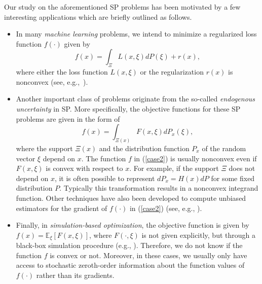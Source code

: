 \documentclass[final]{siamltex}
\newcommand{\beq}{\begin{equation}}
\newcommand{\eeq}{\end{equation}}
\def\eqnok#1{(\ref{#1})}
\newcommand{\bbe}{\mathbb{E}}
\begin{document}
Our study on the aforementioned SP problems
has been motivated by a few interesting applications which are briefly
outlined as follows.
\begin{itemize}
\item In many {\sl machine learning} problems,
we intend to minimize a regularized loss function $f(\cdot)$ given by
\beq \label{case1}
 f(x) = \int_{\Xi} L(x,\xi) dP(\xi) + r(x),
\eeq
where either the loss function $L(x,\xi)$ or the regularization
$r(x)$ is nonconvex (see, e.g.,~\cite{Mairal09,MasBaxBarFre99}).
\item Another important class of problems originate from the
so-called {\sl endogenous uncertainty} in SP.
More specifically, the objective functions for these SP problems are given
in the form of
\beq \label{case2}
f(x) = \int_{\Xi(x)} F(x,\xi) dP_x(\xi),
\eeq
where the support $\Xi(x)$ and the distribution function $P_x$ of
the random vector $\xi$ depend on $x$. The function $f$
in \eqnok{case2} is usually nonconvex
even if $F(x, \xi)$ is convex with respect to $x$.
For example, if the support $\Xi$ does not depend on $x$,
it is often possible to represent $dP_x=H(x)dP$ for some fixed distribution $P$.
Typically this transformation results in a nonconvex integrand function.
Other techniques have also been developed to compute unbiased estimators for the gradient of $f(\cdot)$
in \eqnok{case2} (see, e.g., \cite{Fu06a,Glasserman91,LE90-1,RubSha93}).
\item
Finally, in {\sl simulation-based optimization},
the objective function is given by $f(x) = \bbe_\xi[F(x,\xi)]$, where
$F(\cdot, \xi)$ is not given explicitly, but through a black-box simulation
procedure (e.g., \cite{Andr98-1,Fu02-1}). Therefore,
we do not know if the function $f$ is convex or not.
Moreover, in these cases, we usually only have access to stochastic
zeroth-order information about the function values of $f(\cdot)$ rather than its gradients.
\end{itemize}
\end{document}
